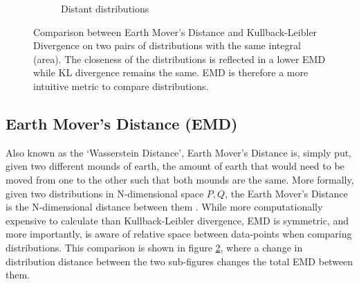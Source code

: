 \begin{figure}[h!]
\begin{subfigure}{.5\textwidth}
        \caption{Distant distributions}
        \label{fig:fardist}
    \end{subfigure}
    \caption[Comparison between Earth Mover's Distance and Kullback-Leibler Divergence]{Comparison between Earth Mover's Distance and Kullback-Leibler Divergence on two pairs of distributions with the same integral (area). The closeness of the distributions is reflected in a lower EMD while KL divergence remains the same. EMD is therefore a more intuitive metric to compare distributions.}
    \label{fig:distributioncompKLEMD}
\end{figure}

\FloatBarrier

\subsection{Earth Mover's Distance (EMD)}

Also known as the `Wasserstein Distance', Earth Mover's Distance is, simply put,
given two different mounds of earth, the amount of earth that would need to be
moved from one to the other such that both mounds are the same. More formally,
given two distributions in N-dimensional space $P, Q$, the Earth Mover's
Distance is the N-dimensional distance between them \autocite{pele_fast_2009}. While more computationally
expensive to calculate than Kullback-Leibler divergence, EMD is symmetric, and
more importantly, is aware of relative space between data-points when comparing
distributions. This comparison is shown in figure
\ref{fig:distributioncompKLEMD}, where a change in distribution distance between
the two sub-figures changes the total EMD between them.